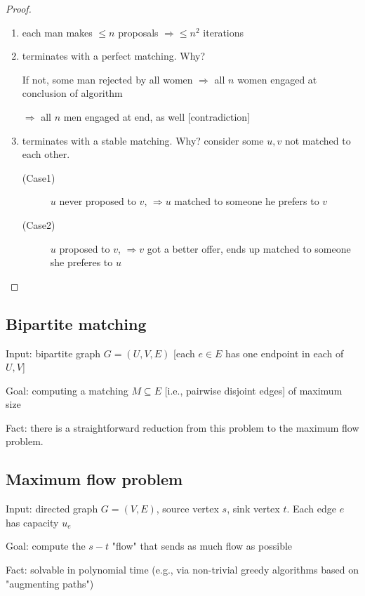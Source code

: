 \documentclass[a4paper,12pt]{article}
\theoremstyle{plain}
\theoremstyle{definition}
\theoremstyle{remark}
\begin{document}
\begin{proof}
\begin{enumerate}
	\item each man makes $\leq n$ proposals $\Rightarrow \leq n^2$ iterations
	\item terminates with a perfect matching. Why?
	
	If not, some man rejected by all women $\Rightarrow$ all $n$ women engaged at conclusion of algorithm
	
	$\Rightarrow$ all $n$ men engaged at end, as well [contradiction]
	\item terminates with a stable matching. Why? consider some $u, v$ not matched to each other.
	
	\begin{description}
		\item[(Case1)] $u$ never proposed to $v$, $\Rightarrow u$ matched to someone he prefers to $v$
		\item[(Case2)] $u$ proposed to $v$, $\Rightarrow v$ got a better offer, ends up matched to someone she preferes to $u$
	\end{description}
\end{enumerate}
\end{proof}



\subsection{Bipartite matching}
Input: bipartite graph $G = (U, V, E)$ [each $e \in E$ has one endpoint in each of $U, V$]

Goal: computing a matching $M \subseteq E$ [i.e., pairwise disjoint edges] of maximum size

Fact: there is a straightforward reduction from this problem to the maximum flow problem.



\subsection{Maximum flow problem}
Input: directed graph $G = (V, E)$, source vertex $s$, sink vertex $t$. Each edge $e$ has capacity $u_e$

Goal: compute the $s-t$ "flow" that sends as much flow as possible

Fact: solvable in polynomial time (e.g., via non-trivial greedy algorithms based on "augmenting paths")
\end{document}
